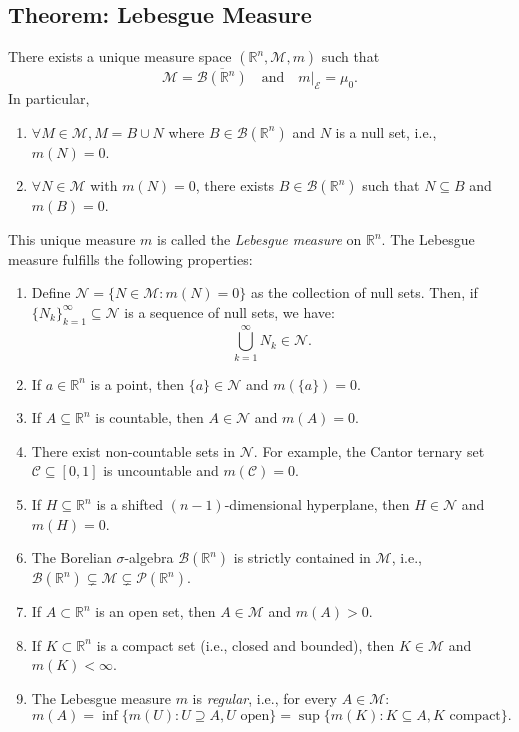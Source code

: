 \documentclass[11pt]{article}
\begin{document}
\subsection{Theorem: Lebesgue Measure}
There exists a unique measure space \((\mathbb{R}^n, \mathcal{M}, m)\) such that
\[\mathcal{M} = \overline{\mathcal{B}(\mathbb{R}^n)} \quad \text{and} \quad m|_{\mathcal{E}} = \mu_0.\]
In particular, 
\begin{enumerate}
    \item \(\forall M \in \mathcal{M}, M = B \cup N\) where \(B \in \mathcal{B}(\mathbb{R}^n)\) and \(N\) is a null set, i.e., \(m(N) = 0\).
    \item \(\forall N \in \mathcal{M}\) with \(m(N) = 0\), there exists \(B \in \mathcal{B}(\mathbb{R}^n)\) such that \(N \subseteq B\) and \(m(B) = 0\).
\end{enumerate}

This unique measure \(m\) is called the \textit{Lebesgue measure} on \(\mathbb{R}^n\). The Lebesgue measure fulfills the following properties:
\begin{enumerate}
    \item Define \(\mathcal{N} = \{N \in \mathcal{M} : m(N) = 0\}\) as the collection of null sets. Then, if \(\{N_k\}_{k=1}^{\infty} \subseteq \mathcal{N}\) is a sequence of null sets, we have:
        \[\bigcup_{k=1}^{\infty} N_k \in \mathcal{N}.\]
    \item If \(a \in \mathbb{R}^n\) is a point, then \(\{a\} \in \mathcal{N}\) and \(m(\{a\}) = 0\).
    \item If \(A \subseteq \mathbb{R}^n\) is countable, then \(A \in \mathcal{N}\) and \(m(A) = 0\).
    \item There exist non-countable sets in \(\mathcal{N}\). For example, the Cantor ternary set \(\mathcal{C} \subseteq [0, 1]\) is uncountable and \(m(\mathcal{C}) = 0\).
    \item If \(H \subseteq \mathbb{R}^n\) is a shifted \((n-1)\)-dimensional hyperplane, then \(H \in \mathcal{N}\) and \(m(H) = 0\).
    \item The Borelian \(\sigma\)-algebra \(\mathcal{B}(\mathbb{R}^n)\) is strictly contained in \(\mathcal{M}\), i.e., \(\mathcal{B}(\mathbb{R}^n) \subsetneq \mathcal{M} \subsetneq \mathcal{P}(\mathbb{R}^n)\).
    \item If \(A \subset \mathbb{R}^n\) is an open set, then \(A \in \mathcal{M}\) and \(m(A) > 0\).
    \item If \(K \subset \mathbb{R}^n\) is a compact set (i.e., closed and bounded), then \(K \in \mathcal{M}\) and \(m(K) < \infty\).
    \item The Lebesgue measure \(m\) is \textit{regular}, i.e., for every \(A \in \mathcal{M}\):
    \[m(A) = \inf\{m(U) : U \supseteq A, U \text{ open}\} = \sup\{m(K) : K \subseteq A, K \text{ compact}\}.\]
\end{enumerate}
\end{document}
